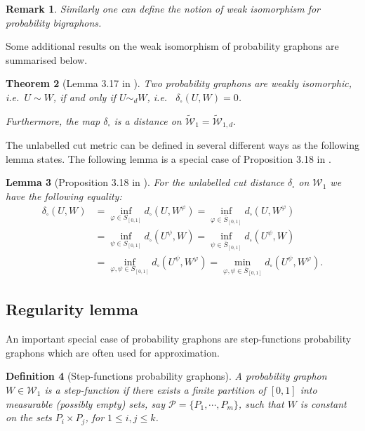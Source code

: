 \documentclass[11pt]{article}
\newtheorem{theorem}{Theorem}[section]
\newtheorem{lemma}[theorem]{Lemma}
\newtheorem{definition}[theorem]{Definition}
\newtheorem{remark}[theorem]{Remark}
\newcommand{\ie}{i.e.\ }
\newcommand{\Graphon}{\mathcal{W}_1}
\newcommand{\UGraphon}{\widetilde{\mathcal{W}}_1}
\newcommand{\UGraphond}{\widetilde{\mathcal{W}}_{1,d}}
\newcommand{\InvRelabel}{S_{[0,1]}}
\newcommand{\Relabel}{\bar{S}_{[0,1]}}
\newcommand{\simd}{\sim_{d}}
\newcommand{\dd}{\delta_{\square}}
\begin{document}
\begin{remark}
Similarly one can define the notion of weak isomorphism for probability bigraphons.     
\end{remark}

Some additional results on the weak isomorphism of probability graphons are summarised below. 

\begin{theorem}[Lemma 3.17 in \cite{abraham2023probabilitygraphons}]
   \label{theo:Wm=W}
   Two probability graphons are weakly isomorphic, \ie $U \sim W$, if and only if
   $U \simd W$, \emph{\ie}  $\dd(U,W) = 0$.

   Furthermore, the map $\dd$ is a distance on $\UGraphon=\UGraphond.$
\end{theorem}

The unlabelled cut metric can be defined in several different ways as the following lemma states. The following lemma is a special case of Proposition 3.18 in \cite{abraham2023probabilitygraphons}.


\begin{lemma}[Proposition 3.18 in \cite{abraham2023probabilitygraphons}]\label{thm_min_dist}
 For the unlabelled cut distance $\dd$ on $\Graphon$ we have the following equality:
\begin{equation}
  \label{eq_premetric}
  \begin{aligned}
\dd(U,W) 
& = \underset{\varphi\in \InvRelabel}{\inf} d_{\square}(U,W^\varphi) 
  = \underset{\varphi\in \Relabel}{\inf} d_{\square}(U,W^\varphi)\\
& = \underset{\psi\in \InvRelabel}{\inf} d_{\square}(U^\psi,W) 
= \underset{\psi\in \Relabel}{\inf} d_{\square}(U^\psi,W) 	\\
& = \underset{\varphi, \psi\in \InvRelabel}{\inf} d_{\square}(U^\psi,W^\varphi) 
= \underset{\varphi,\psi\in \Relabel}{\min} d_{\square}(U^\psi,W^\varphi).
\end{aligned}
\end{equation}
\end{lemma}
\subsection{Regularity lemma}

 An important special case of probability graphons are step-functions probability graphons which are  often used for
approximation.


\begin{definition}[Step-functions probability graphons]
  \label{def:stepfunction}
A probability graphon $W\in \Graphon$ is a \emph{step-function} if there exists a finite partition of $[0,1]$ into measurable (possibly empty) sets, say $\mathcal{P}=\{P_1,\cdots,P_m\}$, such that $W$ is constant on the sets $P_i \times  P_j$, for $1\leq i,j\leq  k$.
  \end{definition}
\end{document}
